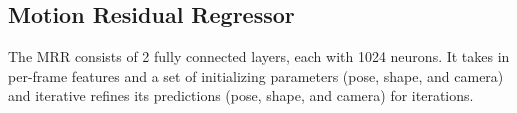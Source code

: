 \documentclass[runningheads]{llncs}
\begin{document}
\subsection{Motion Residual Regressor}
The MRR consists of 2 fully connected layers, each with 1024 neurons. It takes in per-frame features and a set of initializing parameters (pose, shape, and camera) and iterative refines its predictions (pose, shape, and camera) for  iterations. 













\clearpage{}
\end{document}
